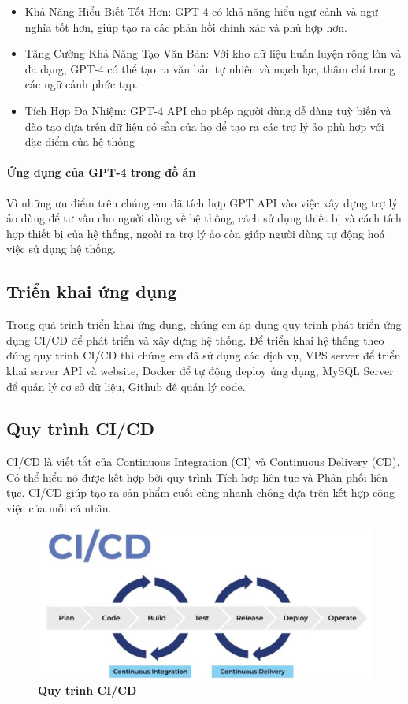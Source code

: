 \begin{itemize}
  \item Khả Năng Hiểu Biết Tốt Hơn: GPT-4 có khả năng hiểu ngữ cảnh và ngữ nghĩa tốt hơn, giúp tạo ra các phản hồi chính xác và phù hợp hơn.
  \item Tăng Cường Khả Năng Tạo Văn Bản: Với kho dữ liệu huấn luyện rộng lớn và đa dạng, GPT-4 có thể tạo ra văn bản tự nhiên và mạch lạc, thậm chí trong các ngữ cảnh phức tạp.
  \item Tích Hợp Đa Nhiệm: GPT-4 API cho phép người dùng dễ dàng tuỳ biến và đào tạo dựa trên dữ liệu có sẵn của họ để tạo ra các trợ lý ảo phù hợp với đặc điểm của hệ thống
\end{itemize}

\paragraph{Ứng dụng của GPT-4 trong đồ án}
\mbox{}

Vì những ưu điểm trên chúng em đã tích hợp GPT API vào việc xây dựng trợ lý ảo dùng để tư vấn cho người dùng về hệ thống, 
cách sử dụng thiết bị và cách tích hợp thiết bị của hệ thống, ngoài ra trợ lý ảo còn giúp người dùng tự động hoá việc sử dụng hệ thống.
\subsection{Triển khai ứng dụng}
Trong quá trình triển khai ứng dụng, chúng em áp dụng quy trình phát triển ứng dụng CI/CD để phát triển và xây dựng hệ thống. Để triển khai hệ thống theo đúng quy trình CI/CD thì chúng em đã sử dụng các dịch vụ, VPS server để triển khai server API và website, Docker để tự động deploy ứng dụng, MySQL Server để quản lý cơ sở dữ liệu, Github để quản lý code.

\subsection{Quy trình CI/CD}
CI/CD là viết tắt của Continuous Integration (CI) và Continuous Delivery (CD). Có thể hiểu nó được kết hợp bởi quy trình Tích hợp liên tục và Phân phối liên tục. CI/CD giúp tạo ra sản phẩm cuối cùng nhanh chóng dựa trên kết hợp công việc của mỗi cá nhân.



\begin{figure}[H]
  \centering
  \includegraphics[scale=0.3]{Images/server/deploy/ci-cd.png}
  \caption[Quy trình CI/CD]{\bfseries \fontsize{12pt}{0pt}
  \selectfont Quy trình CI/CD}
  \label{ci-cd} %
\end{figure}

